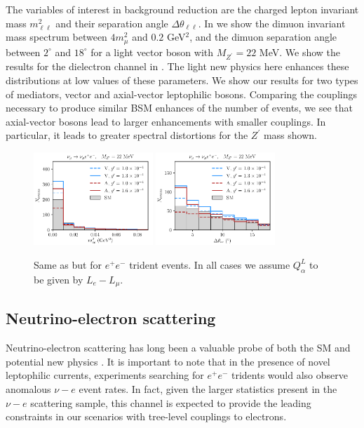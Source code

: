 The variables of interest in background reduction are the charged lepton invariant mass $m^2_{\ell \ell}$ and their separation angle $\Delta \theta_{\ell\ell}$. In  we show the dimuon invariant mass spectrum between $4 m_{\mu}^2$ and $0.2$ GeV$^2$, and the dimuon separation angle between $2^\circ$ and $18^\circ$ for a light vector boson with $M_{Z^\prime} = 22$ MeV. We show the results for the dielectron channel in . The light new physics here enhances these distributions at low values of these parameters. We show our results for two types of mediators, vector and axial-vector leptophilic bosons. Comparing the couplings necessary to produce similar BSM enhances 
of the number of events, we see that axial-vector bosons lead to larger enhancements with smaller couplings. In particular, it leads to greater spectral distortions for the $Z^\prime$ mass shown.
%
\begin{figure}[t]
%
\centering
%
\includegraphics[width=0.4\textwidth]{BSM_invmass_ee.pdf}
\includegraphics[width=0.4\textwidth]{BSM_sepangle_ee.pdf}
%
\caption{Same as  but for $e^+e^-$ trident events. In all cases we assume $Q^L_{\alpha}$ to be given by $L_e - L_\mu$. \label{fig:ee_spectra}}
%
\end{figure}
%


\subsection{Neutrino-electron scattering}

Neutrino-electron scattering has long been a valuable probe of both the SM and potential new physics \cite{Marciano:2003eq,deGouvea:2006hfo,PhysRevD.93.093019,Lindner:2018kjo}. It is important to note that in the presence of novel leptophilic currents, experiments searching for $e^+e^-$ tridents would also observe anomalous $\nu-e$ event rates. In fact, given the larger statistics present in the $\nu-e$ scattering sample, this channel is expected to provide the leading constraints in our scenarios with tree-level couplings to electrons. 


